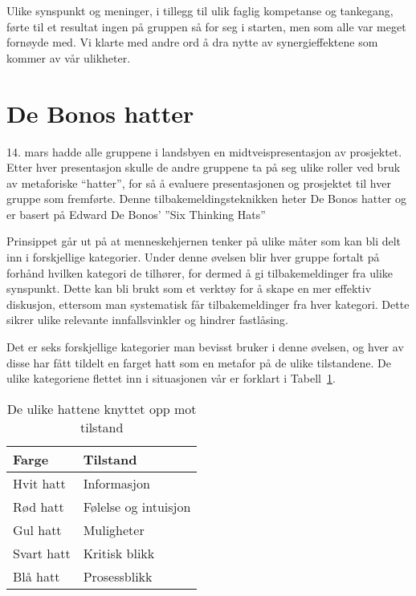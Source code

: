 Ulike synspunkt og meninger, i tillegg til ulik faglig kompetanse og tankegang, førte til et resultat ingen på gruppen så for seg i starten, men som alle var meget fornøyde med. Vi klarte med andre ord å dra nytte av synergieffektene som kommer av vår ulikheter.



\section{De Bonos hatter} %
14. mars hadde alle gruppene i landsbyen en midtveispresentasjon av
prosjektet. Etter hver presentasjon skulle de andre gruppene ta på seg
ulike roller ved bruk av metaforiske “hatter”, for så å evaluere
presentasjonen og prosjektet til hver gruppe som fremførte. Denne
tilbakemeldingsteknikken heter De Bonos hatter og er basert på Edward De
Bonos' ''Six Thinking Hats'' \cite{bonos}

Prinsippet går ut på at menneskehjernen tenker på ulike måter som kan
bli delt inn i forskjellige kategorier. Under denne øvelsen blir hver
gruppe fortalt på forhånd hvilken kategori de tilhører, for dermed å gi
tilbakemeldinger fra ulike synspunkt. Dette kan bli brukt som et verktøy
for å skape en mer effektiv diskusjon, ettersom man systematisk får
tilbakemeldinger fra hver kategori. Dette sikrer ulike relevante
innfallsvinkler og hindrer fastlåsing.

Det er seks forskjellige kategorier man bevisst bruker i denne øvelsen,
og hver av disse har fått tildelt en farget hatt som en metafor på de
ulike tilstandene. De ulike kategoriene flettet inn i situasjonen vår er
forklart i Tabell~\ref{tab:hats}.
\\
\begin{table} [H]
\centering
\begin{tabular}{| l | l |}
\hline
\bf{Farge} & \bf{Tilstand} \\
\hline
Hvit hatt & Informasjon \\
Rød hatt & Følelse og intuisjon \\
Gul hatt & Muligheter \\
Svart hatt & Kritisk blikk \\
Blå hatt & Prosessblikk \\
\hline
\end{tabular}
\caption{De ulike hattene knyttet opp mot tilstand}
\label{tab:hats}
\end{table}

\vspace{1.0em}

